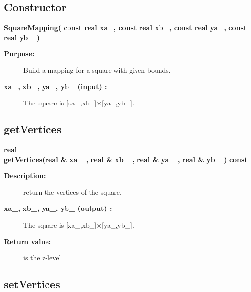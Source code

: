\subsection{Constructor}
 
\newlength{\SquareMappingIncludeArgIndent}
\begin{flushleft} \textbf{%
\settowidth{\SquareMappingIncludeArgIndent}{SquareMapping(}%
SquareMapping( const real xa\_, const real xb\_, const real ya\_, const real yb\_ ) 
}\end{flushleft}
\begin{description}
\item[{\bf Purpose:}]  Build a mapping for a square with given bounds.
\item[{\bf xa\_, xb\_, ya\_, yb\_ (input) :}]  The square is [xa\_,xb\_]$\times$[ya\_,yb\_].
\end{description}
\subsection{getVertices}
 
\begin{flushleft} \textbf{%
real  \\ 
\settowidth{\SquareMappingIncludeArgIndent}{getVertices(}%
getVertices(real \& xa\_ , real \& xb\_ , real \& ya\_ , real \& yb\_  ) const
}\end{flushleft}
\begin{description}
\item[{\bf Description:}]  return the vertices of the square.
\item[{\bf xa\_, xb\_, ya\_, yb\_ (output) :}]  The square is [xa\_,xb\_]$\times$[ya\_,yb\_].
\item[{\bf Return value:}]  is the z-level 
\end{description}
\subsection{setVertices}
 
